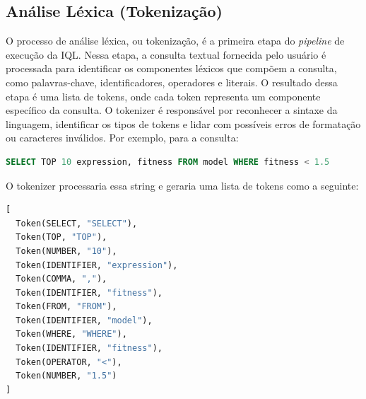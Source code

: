 \begin{figure}[htbp]
    \label{fig:iql_execution_pipeline}
\end{figure}

\subsection{Análise Léxica (Tokenização)}
O processo de análise léxica, ou tokenização, é a primeira etapa do \textit{pipeline} de execução da IQL. Nessa etapa, a consulta textual fornecida pelo usuário é processada para identificar os componentes léxicos que compõem a consulta, como palavras-chave, identificadores, operadores e literais. O resultado dessa etapa é uma lista de tokens, onde cada token representa um componente específico da consulta. O tokenizer é responsável por reconhecer a sintaxe da linguagem, identificar os tipos de tokens e lidar com possíveis erros de formatação ou caracteres inválidos. Por exemplo, para a consulta:
\begin{lstlisting}[language=SQL]
SELECT TOP 10 expression, fitness FROM model WHERE fitness < 1.5
\end{lstlisting}

O tokenizer processaria essa string e geraria uma lista de tokens como a seguinte:
\begin{lstlisting}[language=Python]
[
  Token(SELECT, "SELECT"),
  Token(TOP, "TOP"),
  Token(NUMBER, "10"),
  Token(IDENTIFIER, "expression"),
  Token(COMMA, ","),
  Token(IDENTIFIER, "fitness"),
  Token(FROM, "FROM"),
  Token(IDENTIFIER, "model"),
  Token(WHERE, "WHERE"),
  Token(IDENTIFIER, "fitness"),
  Token(OPERATOR, "<"),
  Token(NUMBER, "1.5")
]
\end{lstlisting}

